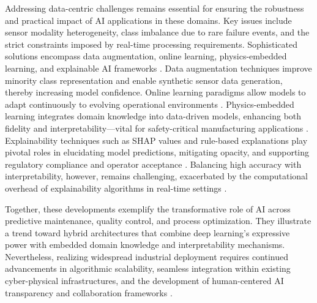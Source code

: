 \documentclass[sigconf]{acmart}
\begin{document}
Addressing data-centric challenges remains essential for ensuring the robustness and practical impact of AI applications in these domains. Key issues include sensor modality heterogeneity, class imbalance due to rare failure events, and the strict constraints imposed by real-time processing requirements. Sophisticated solutions encompass data augmentation, online learning, physics-embedded learning, and explainable AI frameworks \cite{ref29,ref34,ref37,ref38}. Data augmentation techniques improve minority class representation and enable synthetic sensor data generation, thereby increasing model confidence. Online learning paradigms allow models to adapt continuously to evolving operational environments \cite{ref29}. Physics-embedded learning integrates domain knowledge into data-driven models, enhancing both fidelity and interpretability—vital for safety-critical manufacturing applications \cite{ref34}. Explainability techniques such as SHAP values and rule-based explanations play pivotal roles in elucidating model predictions, mitigating opacity, and supporting regulatory compliance and operator acceptance \cite{ref38}. Balancing high accuracy with interpretability, however, remains challenging, exacerbated by the computational overhead of explainability algorithms in real-time settings \cite{ref37}.

Together, these developments exemplify the transformative role of AI across predictive maintenance, quality control, and process optimization. They illustrate a trend toward hybrid architectures that combine deep learning’s expressive power with embedded domain knowledge and interpretability mechanisms. Nevertheless, realizing widespread industrial deployment requires continued advancements in algorithmic scalability, seamless integration within existing cyber-physical infrastructures, and the development of human-centered AI transparency and collaboration frameworks \cite{ref9,ref24,ref36}.
\end{document}
